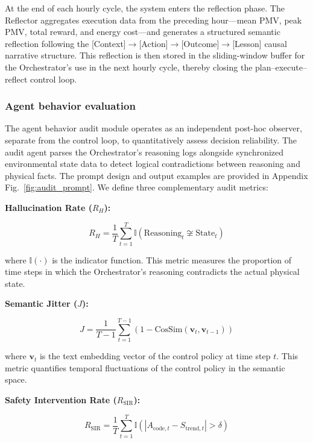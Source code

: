 \documentclass[a4paper]{cas-sc}
\begin{document}
At the end of each hourly cycle, the system enters the reflection phase. The Reflector aggregates execution data from the preceding hour---mean PMV, peak PMV, total reward, and energy cost---and generates a structured semantic reflection following the [Context]$\rightarrow$[Action]$\rightarrow$[Outcome]$\rightarrow$[Lesson] causal narrative structure. This reflection is then stored in the sliding-window buffer for the Orchestrator's use in the next hourly cycle, thereby closing the plan--execute--reflect control loop.

\subsubsection{Agent behavior evaluation}

The agent behavior audit module operates as an independent post-hoc observer, separate from the control loop, to quantitatively assess decision reliability. The audit agent parses the Orchestrator's reasoning logs alongside synchronized environmental state data to detect logical contradictions between reasoning and physical facts. The prompt design and output examples are provided in Appendix Fig.~\ref{fig:audit_prompt}. We define three complementary audit metrics:

\textbf{Hallucination Rate ($R_H$):}

\begin{equation}
R_H = \frac{1}{T} \sum_{t=1}^{T} \mathbb{I}(\text{Reasoning}_t \not\cong \text{State}_t)
\label{eq:hallucination}
\end{equation}

\noindent where $\mathbb{I}(\cdot)$ is the indicator function. This metric measures the proportion of time steps in which the Orchestrator's reasoning contradicts the actual physical state.

\textbf{Semantic Jitter ($J$):}

\begin{equation}
J = \frac{1}{T-1} \sum_{t=1}^{T-1} (1 - \text{CosSim}(\mathbf{v}_t, \mathbf{v}_{t-1}))
\label{eq:jitter}
\end{equation}

\noindent where $\mathbf{v}_t$ is the text embedding vector of the control policy at time step $t$. This metric quantifies temporal fluctuations of the control policy in the semantic space.

\textbf{Safety Intervention Rate ($R_{\text{SIR}}$):}

\begin{equation}
R_{\text{SIR}} = \frac{1}{T} \sum_{t=1}^{T} \mathbb{I}(|A_{\text{code},t} - S_{\text{trend},t}| > \delta)
\label{eq:sir}
\end{equation}
\end{document}

